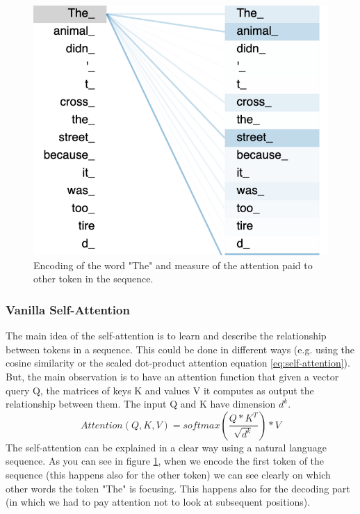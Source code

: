 \begin{figure}
	\begin{center}
	\includegraphics[width=1\linewidth]{img/nl_seq.png}
	\end{center}
	\caption{Encoding of the word "The" and measure of the attention paid to other token in the sequence.}
	\label{fig:nl_seq}
\end{figure}
\subsubsection{Vanilla Self-Attention}
The main idea of the self-attention \cite{AIAYN} is to learn and describe the relationship between tokens in a sequence. This could be done in different ways (e.g. using the cosine similarity or the scaled dot-product attention equation \ref{eq:self-attention}). But, the main observation is to have an attention function that given a vector query Q, the matrices of keys K and values V it computes as output the relationship between them. The input Q and K have dimension $d^{k}$.
\begin{equation}
	Attention(Q,K,V) = softmax(\frac{Q*K^{T}}{\sqrt{d^{k}}})*V
	\label{eq:self-attention}
\end{equation} 
\newline
The self-attention can be explained in a clear way using a natural language sequence. As you can see in figure \ref{fig:nl_seq}, when we encode the first token of the sequence (this happens also for the other token) we can see clearly on which other words the token "The" is focusing. This happens also for the decoding part (in which we had to pay attention not to look at subsequent positions).

